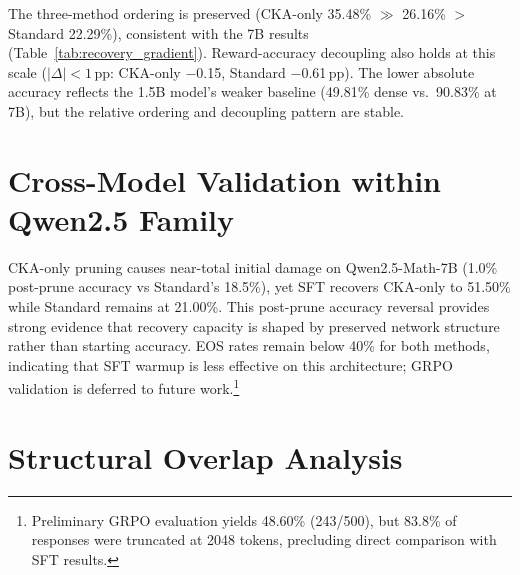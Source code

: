 

The three-method ordering is preserved (CKA-only 35.48\% $\gg$ \rasp{} 26.16\% $>$ Standard 22.29\%), consistent with the 7B results (Table~\ref{tab:recovery_gradient}).
Reward-accuracy decoupling also holds at this scale ($|\Delta| < 1$\,pp: CKA-only $-$0.15, Standard $-$0.61\,pp).
The lower absolute accuracy reflects the 1.5B model's weaker baseline (49.81\% dense vs.\ 90.83\% at 7B), but the relative ordering and decoupling pattern are stable.

\section{Cross-Model Validation within Qwen2.5 Family}
\label{sec:appendix_cross_arch}

\begin{table}[h]
\centering
\small
\caption{Cross-model validation on Qwen2.5-Math-7B~\citep{qwen2.5} (same Qwen2.5 architecture family) at 20\% structured sparsity. Accuracy evaluated on GSM8K ($N{=}200$). Post-SFT reports accuracy $\pm$ binomial standard error ($N{=}200$). EOS rate: fraction of generations that produce a valid end-of-sequence token.}
\label{tab:cross_arch}
\end{table}

CKA-only pruning causes near-total initial damage on Qwen2.5-Math-7B (1.0\% post-prune accuracy vs Standard's 18.5\%), yet SFT recovers CKA-only to 51.50\% while Standard remains at 21.00\%.
This post-prune accuracy reversal provides strong evidence that recovery capacity is shaped by preserved network structure rather than starting accuracy.
EOS rates remain below 40\% for both methods, indicating that SFT warmup is less effective on this architecture; GRPO validation is deferred to future work.\footnote{Preliminary GRPO evaluation yields 48.60\% (243/500), but 83.8\% of responses were truncated at 2048 tokens, precluding direct comparison with SFT results.}

\section{Structural Overlap Analysis}
\label{sec:appendix_overlap}

